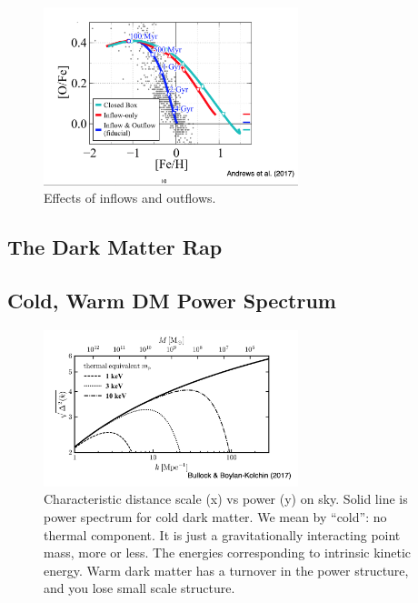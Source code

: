 \documentclass{article}
\begin{document}
\begin{figure}
    \centering
    \includegraphics[width=0.66\textwidth]{figs/Screen Shot 2021-10-13 at 10.07.32 AM.png}
    \caption{Effects of inflows and outflows. }
    \label{fig:Examples23}
\end{figure}

\subsection{The Dark Matter Rap}

\subsection{Cold, Warm DM Power Spectrum}

\begin{figure}
    \centering
    \includegraphics[width=0.66\textwidth]{figs/Screen Shot 2021-10-13 at 10.21.42 AM.png}
    \caption{Characteristic distance scale (x) vs power (y) on sky. Solid line is power spectrum for cold dark matter. We mean by ``cold'': no thermal component. It is just a gravitationally interacting point mass, more or less. The energies corresponding to intrinsic kinetic energy. Warm dark matter has a turnover in the power structure, and you lose small scale structure. }
    \label{fig:DarkMatterPowerSpectrum}
\end{figure}
\end{document}
